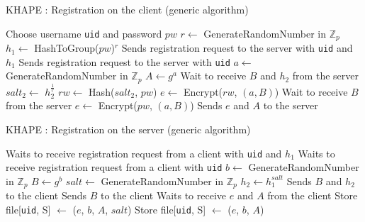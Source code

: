 ﻿\documentclass[../report.tex]{subfiles}
\begin{document}
\begin{algorithm}
\caption{KHAPE : Registration on the client (generic algorithm)}
\label{alg:register_client}
\begin{algorithmic}
\Require Choose username \verb|uid| and password $pw$
    \State $r \gets$ GenerateRandomNumber in $\mathbb{Z}_p$
    \State $h_1 \gets$ HashToGroup($pw$)$^r$
    \State Sends registration request to the server with \verb|uid| and $h_1$
\Else
    \State Sends registration request to the server with \verb|uid|
\EndIf
\State $a \gets$ GenerateRandomNumber in $\mathbb{Z}_p$
\State $A \gets g^a$
    \State Wait to receive $B$ and $h_2$ from the server
    \State $salt_2 \gets$ $h_2^{\frac{1}{r}}$
    \State $rw \gets$ Hash($salt_2$, $pw$)
    \State $e \gets$ Encrypt($rw$, $(a, B)$)
\Else
    \State Wait to receive $B$ from the server
    \State $e \gets$ Encrypt($pw$, $(a, B)$)
\EndIf
\State Sends $e$ and $A$ to the server

\end{algorithmic}
\end{algorithm}
\begin{algorithm}
\caption{KHAPE : Registration on the server (generic algorithm)}
\label{alg:register_server}
\begin{algorithmic}
\Require 
{}
    \State Waits to receive registration request from a client with \verb|uid| and $h_1$
\Else
    \State Waits to receive registration request from a client with \verb|uid|
\EndIf
\State $b \gets$ GenerateRandomNumber in $\mathbb{Z}_p$
\State $B \gets g^b$
    \State $salt \gets$ GenerateRandomNumber in $\mathbb{Z}_p$
    \State $h_2 \gets h_1^{salt}$    
    \State Sends $B$ and $h_2$ to the client
\Else
    \State Sends $B$ to the client
\EndIf
\State Waits to receive $e$ and $A$ from the client
    \State Store file[\verb|uid|, S] $\gets$ ($e$, $b$, $A$, $salt$) %
\Else
    \State Store file[\verb|uid|, S] $\gets$ ($e$, $b$, $A$) %
\EndIf
\end{algorithmic}
\end{algorithm}
\end{document}
